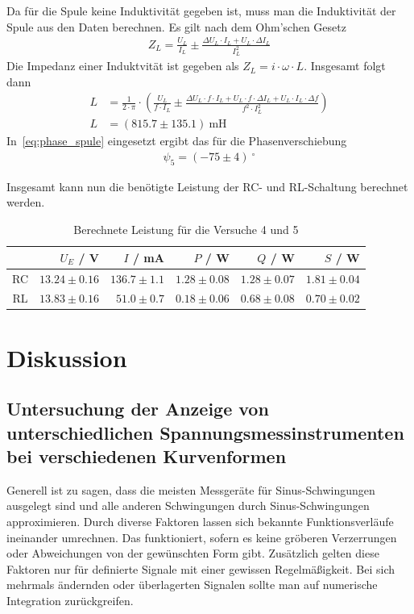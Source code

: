 \documentclass{article}
\begin{document}
Da für die Spule keine Induktivität gegeben ist, muss man die Induktivität der Spule aus den Daten berechnen. Es gilt nach dem Ohm'schen Gesetz
\begin{align*}
Z_L = \frac{U_L}{I_L} \pm \frac{\Delta U_L\cdot I_L + U_L\cdot \Delta I_L}{I_L^2}
\end{align*}
Die Impedanz einer Induktvität ist gegeben als $Z_L = i\cdot \omega \cdot L$. Insgesamt folgt dann
\begin{align*}
L &= \frac{1}{2\cdot \pi}\cdot \left(\frac{U_L}{ f \cdot I_L} \pm \frac{\Delta U_L\cdot f\cdot  I_L + U_L\cdot f\cdot  \Delta I_L + U_L\cdot I_L\cdot \Delta f}{f^2\cdot I_L^2}\right)\\
L &= (815.7 \pm 135.1)~\text{mH}
\end{align*}
In~\eqref{eq:phase_spule} eingesetzt ergibt das für die Phasenverschiebung
\begin{align*}
\psi_5 = (-75 \pm 4)~^\circ
\end{align*}


Insgesamt kann nun die benötigte Leistung der RC- und RL-Schaltung berechnet werden.

\begin{table}[H]
\caption{Berechnete Leistung für die Versuche 4 und 5}
\label{tab:task45_leistung_ergebnis}

\begin{tabular}{c|rrrrr}
& $U_E$ / V & $I$ / mA & $P$ / W & $Q$ / W & $S$ / W \\
\hline 
RC & $13.24\pm0.16$ & $136.7\pm1.1$ & $1.28\pm 0.08$  & $1.28 \pm 0.07$ & $1.81\pm 0.04$   \\
RL & $13.83\pm0.16$ & $51.0\pm0.7$ & $0.18\pm0.06$  & $0.68 \pm 0.08$ & $0.70 \pm 0.02$ 
\end{tabular}
\end{table}





\section{Diskussion}


\subsection{Untersuchung  der  Anzeige  von  unterschiedlichen  Spannungsmessinstrumenten  bei verschiedenen Kurvenformen }


Generell ist zu sagen, dass die meisten Messgeräte für Sinus-Schwingungen ausgelegt sind und alle anderen Schwingungen durch Sinus-Schwingungen approximieren. Durch diverse Faktoren lassen sich bekannte Funktionsverläufe ineinander umrechnen. Das funktioniert, sofern es keine gröberen Verzerrungen oder Abweichungen von der gewünschten Form gibt. Zusätzlich gelten diese Faktoren nur für definierte Signale mit einer gewissen Regelmäßigkeit. Bei sich mehrmals ändernden oder überlagerten Signalen sollte man auf numerische Integration zurückgreifen.
\end{document}
